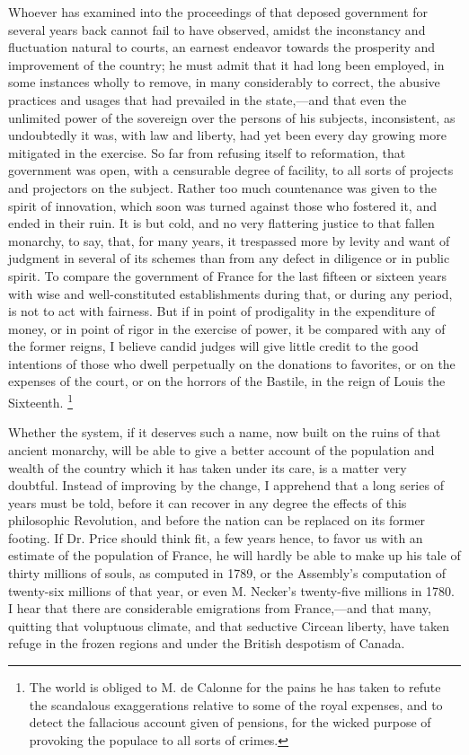Whoever has examined into the proceedings of that deposed government for several years back cannot fail to have observed, amidst the inconstancy and fluctuation natural to courts, an earnest endeavor towards the prosperity and improvement of the country; he must admit that it had long been employed, in some instances wholly to remove, in many considerably to correct, the abusive practices and usages that had prevailed in the state,—and that even the unlimited power of the sovereign over the persons of his subjects, inconsistent, as undoubtedly it was, with law and liberty, had yet been every day growing more mitigated in the exercise. So far from refusing itself to reformation, that government was open, with a censurable degree of facility, to all sorts of projects and projectors on the subject. Rather too much countenance was given to the spirit of innovation, which soon was turned against those who fostered it, and ended in their ruin. It is but cold, and no very flattering justice to that fallen monarchy, to say, that, for many years, it trespassed more by levity and want of judgment in several of its schemes than from any defect in diligence or in public spirit. To compare the government of France for the last fifteen or sixteen years with wise and well-constituted establishments during that, or during any period, is not to act with fairness. But if in point of prodigality in the expenditure of money, or in point of rigor in the exercise of power, it be compared with any of the former reigns, I believe candid judges will give little credit to the good intentions of those who dwell perpetually on the donations to favorites, or on the expenses of the court, or on the horrors of the Bastile, in the reign of Louis the Sixteenth.
\footnote{ The world is obliged to M. de Calonne for the pains he has taken to refute the scandalous exaggerations relative to some of the royal expenses, and to detect the fallacious account given of pensions, for the wicked purpose of provoking the populace to all sorts of crimes.}


Whether the system, if it deserves such a name, now built on the ruins of that ancient monarchy, will be able to give a better account of the population and wealth of the country which it has taken under its care, is a matter very doubtful. Instead of improving by the change, I apprehend that a long series of years must be told, before it can recover in any degree the effects of this philosophic Revolution, and before the nation can be replaced on its former footing. If Dr. Price should think fit, a few years hence, to favor us with an estimate of the population of France, he will hardly be able to make up his tale of thirty millions of souls, as computed in 1789, or the Assembly's computation of twenty-six millions of that year, or even M. Necker's twenty-five millions in 1780. I hear that there are considerable emigrations from France,—and that many, quitting that voluptuous climate, and that seductive Circean liberty, have taken refuge in the frozen regions and under the British despotism of Canada.

